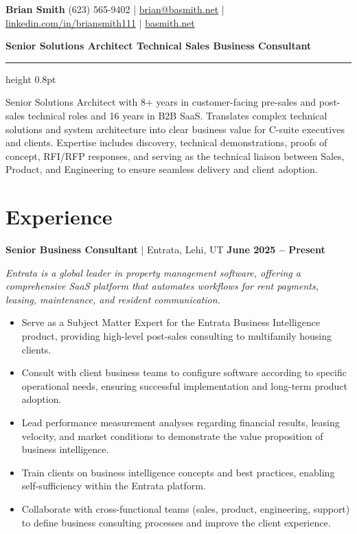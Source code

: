 \documentclass[10pt,letterpaper]{article}
\newcommand{\role}[4]{%
  \vspace{4pt}%
  {\textbf{#2} \textcolor{rulegray}{|} #1 \hfill \textbf{#3}}\par
  {\small\itshape #4\par}}
\newenvironment{roleblock}{\par\begin{minipage}{\textwidth}}{\end{minipage}\par\vspace{7pt}}
\begin{document}
{\huge\bfseries Brian Smith}\hfill
{(623) 565-9402 \;|\; \href{mailto:brian@basmith.net}{brian@basmith.net} \;|\;
\href{https://www.linkedin.com/in/briansmith111}{linkedin.com/in/briansmith111} \;|\;
\href{https://basmith.net}{basmith.net}}\par
\vspace{2pt}
{\color{accent}\bfseries Senior Solutions Architect \;\textbullet\; Technical Sales \;\textbullet\; Business Consultant}\par
\vspace{4pt}
{\color{rulegray}\hrule height 0.8pt}
\vspace{6pt}

Senior Solutions Architect with 8+ years in customer-facing pre-sales and post-sales technical roles and 16 years in B2B SaaS. Translates complex technical solutions and system architecture into clear business value for C-suite executives and clients. Expertise includes discovery, technical demonstrations, proofs of concept, RFI/RFP responses, and serving as the technical liaison between Sales, Product, and Engineering to ensure seamless delivery and client adoption.

\section{Experience}

\begin{roleblock}
\role{Entrata, Lehi, UT}{Senior Business Consultant}{June 2025 -- Present}
{Entrata is a global leader in property management software, offering a comprehensive SaaS platform that automates workflows for rent payments, leasing, maintenance, and resident communication.}
\begin{itemize}
  \item Serve as a Subject Matter Expert for the Entrata Business Intelligence product, providing high-level post-sales consulting to multifamily housing clients.
  \item Consult with client business teams to configure software according to specific operational needs, ensuring successful implementation and long-term product adoption.
  \item Lead performance measurement analyses regarding financial results, leasing velocity, and market conditions to demonstrate the value proposition of business intelligence.
  \item Train clients on business intelligence concepts and best practices, enabling self-sufficiency within the Entrata platform.
  \item Collaborate with cross-functional teams (sales, product, engineering, support) to define business consulting processes and improve the client experience.
\end{itemize}
\end{roleblock}
\end{document}
